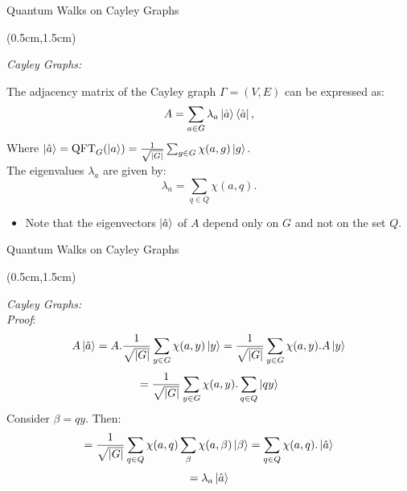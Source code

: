 \documentclass{beamer}
\theoremstyle{definition}
\begin{document}
\begin{frame}{Quantum Walks on Cayley Graphs}
    
    \begin{textblock*}{12cm}(0.5cm,1.5cm)
        
        \textit{Cayley Graphs:} \\
        \vspace{0.3cm}
        
        The adjacency matrix of the Cayley graph $\Gamma = (V,E)$ can be expressed as:
        \[ A = \sum_{a \in G} \lambda_a \ket{\hat{a}} \bra{\hat{a}}, \]
        Where $\ket{\hat{a}} = \operatorname{QFT}_G(\ket{a}) =  \frac{1}{\sqrt{|G|}}\sum_{g \in G}\chi(a,g)\ket{g}$. \\
        The eigenvalues $\lambda_a$ are given by:
        \[ \lambda_a = \sum_{q \in Q} \chi(a, q). \]
        \begin{itemize}
            \item  Note that the eigenvectors $\ket{\hat{a}}$ of $A$ depend only on $G$ and not on the set $Q$.
        \end{itemize}
    
    \end{textblock*}


\end{frame}








\begin{frame}{Quantum Walks on Cayley Graphs}
    
    \begin{textblock*}{12cm}(0.5cm,1.5cm)
        
        \textit{Cayley Graphs:} \\
        \vspace{0.3cm}
        \textit{Proof}:
        \[
        A\ket{\hat{a}} = A.\frac{1}{\sqrt{|G|}}\sum_{y \in G}\chi(a,y)\ket{y} = \frac{1}{\sqrt{|G|}}\sum_{y \in G}\chi(a,y).A\ket{y}
        \]
        \[
        = \frac{1}{\sqrt{|G|}}\sum_{y \in G}\chi(a,y).\sum_{q \in Q}\ket{qy}
        \]
        Consider $\beta = qy$. Then:
        \[
         = \frac{1}{\sqrt{|G|}}\sum_{q \in Q}\chi(a,q)\sum_{\beta}\chi(a,\beta)\ket{\beta} = \sum_{q \in Q}\chi(a,q) . \ket{\hat{a}}
        \]
        \[
         = \lambda_a\ket{\hat{a}}
        \]
    \end{textblock*}
\end{frame}
\end{document}
